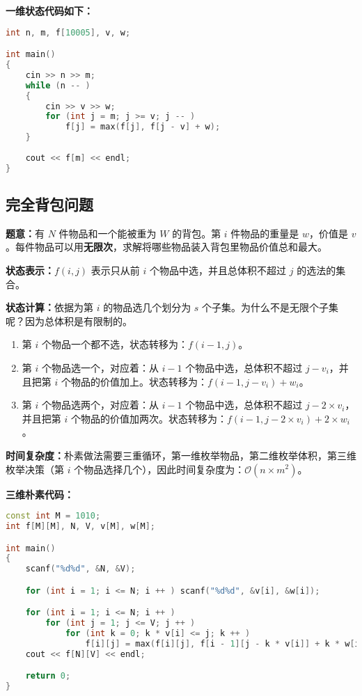 \textbf{一维状态代码如下：}

\begin{lstlisting}[language=cpp]
int n, m, f[10005], v, w;

int main()
{
    cin >> n >> m;
    while (n -- )
    {
        cin >> v >> w;
        for (int j = m; j >= v; j -- )
            f[j] = max(f[j], f[j - v] + w);
    }
    
    cout << f[m] << endl;
}
\end{lstlisting}

\subsection{完全背包问题}

\textbf{题意：}有 $N$ 件物品和一个能被重为 $W$ 的背包。第 $i$ 件物品的重量是 $w$，价值是 $v$ 。每件物品可以用\textbf{无限次}，求解将哪些物品装入背包里物品价值总和最大。

\textbf{状态表示：}$f(i, j)$ 表示只从前 $i$ 个物品中选，并且总体积不超过 $j$ 的选法的集合。

\textbf{
状态计算：}依据为第 $i$ 的物品选几个划分为 $s$ 个子集。为什么不是无限个子集呢？因为总体积是有限制的。

\begin{enumerate}
\item 第 $i$ 个物品一个都不选，状态转移为：$f(i - 1, j)$。
\item 第 $i$ 个物品选一个，对应着：从 $i - 1$ 个物品中选，总体积不超过 $j - v_i$，并且把第 $i$ 个物品的价值加上。状态转移为：$f(i - 1, j - v_i) + w_i$。
\item 第 $i$ 个物品选两个，对应着：从 $i - 1$ 个物品中选，总体积不超过 $j - 2 \times v_i$，并且把第 $i$ 个物品的价值加两次。状态转移为：$f(i - 1, j - 2 \times v_i) + 2 \times w_i$。
\end{enumerate}

\textbf{时间复杂度：}朴素做法需要三重循环，第一维枚举物品，第二维枚举体积，第三维枚举决策（第 $i$ 个物品选择几个），因此时间复杂度为：$\mathcal{O}(n \times m^2)$。

\textbf{三维朴素代码：}

\begin{lstlisting}[language=cpp]
const int M = 1010;
int f[M][M], N, V, v[M], w[M];

int main()
{
    scanf("%d%d", &N, &V);

    for (int i = 1; i <= N; i ++ ) scanf("%d%d", &v[i], &w[i]);

    for (int i = 1; i <= N; i ++ ) 
        for (int j = 1; j <= V; j ++ ) 
            for (int k = 0; k * v[i] <= j; k ++ )
                f[i][j] = max(f[i][j], f[i - 1][j - k * v[i]] + k * w[i]);
    cout << f[N][V] << endl;

    return 0;
}
\end{lstlisting}

